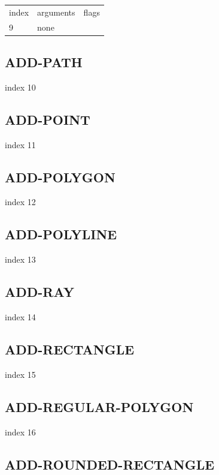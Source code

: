 \documentclass[11pt]{report}
\begin{document}
\begin{center}
\begin{tabular}{l | l | l}
index & arguments & flags \\
9 & none & 
\end{tabular}
\end{center}

\subsection{ADD-PATH}

index 10

\subsection{ADD-POINT}

index 11

\subsection{ADD-POLYGON}

index 12

\subsection{ADD-POLYLINE}

index 13

\subsection{ADD-RAY}

index 14

\subsection{ADD-RECTANGLE}

index 15

\subsection{ADD-REGULAR-POLYGON}

index 16

\subsection{ADD-ROUNDED-RECTANGLE}
\end{document}
